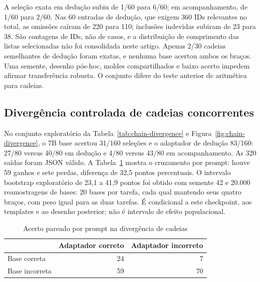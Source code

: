 \documentclass[12pt,a4paper]{article}
\begin{document}
A seleção exata em dedução subiu de 1/60 para 6/60; em acompanhamento, de 1/60 para 2/60. Nas 60 entradas de dedução, que exigem 360 IDs relevantes no total, as omissões caíram de 220 para 110; inclusões indevidas subiram de 23 para 38. São contagens de IDs, não de casos, e a distribuição de comprimento das listas selecionadas não foi consolidada neste artigo. Apenas 2/30 cadeias semelhantes de dedução foram exatas, e nenhuma base acertou ambos os braços. Uma semente, desenho pós-hoc, moldes compartilhados e baixo acerto impedem afirmar transferência robusta. O conjunto difere do teste anterior de aritmética para cadeias.

\subsection{Divergência controlada de cadeias concorrentes}
No conjunto exploratório da Tabela~\ref{tab:chain-divergence} e Figura~\ref{fig:chain-divergence}, o 7B base acertou 31/160 seleções e o adaptador de dedução 83/160: 27/80 versus 40/80 em dedução e 4/80 versus 43/80 em acompanhamento. As 320 saídas foram JSON válido. A Tabela~\ref{tab:paired} mostra o cruzamento por prompt: houve 59 ganhos e sete perdas, diferença de 32,5 pontos percentuais. O intervalo bootstrap exploratório de 23,1 a 41,9 pontos foi obtido com semente 42 e 20.000 reamostragens de bases: 20 bases por tarefa, cada qual mantendo seus quatro braços, com peso igual para as duas tarefas. É condicional a este checkpoint, aos templates e ao desenho posterior; não é intervalo de efeito populacional.

\begin{table}[htbp]\centering\caption{Acerto pareado por prompt na divergência de cadeias}\label{tab:paired}\begin{tabular}{lrr}\toprule & Adaptador correto & Adaptador incorreto \\\midrule Base correta & 24 & 7 \\ Base incorreta & 59 & 70 \\\bottomrule\end{tabular}\par{}\end{table}
\end{document}

